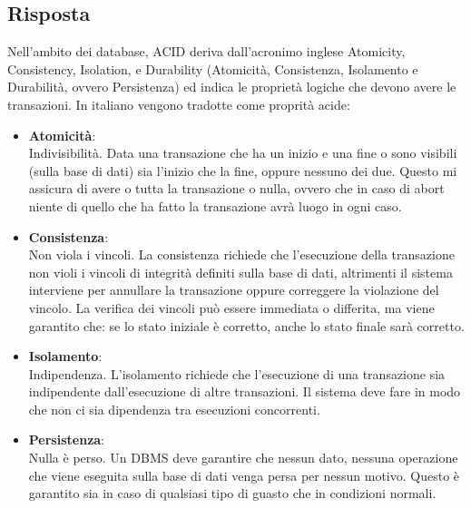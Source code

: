 \documentclass{article}
\begin{document}
\subsection*{Risposta}
Nell'ambito dei database, ACID deriva dall'acronimo inglese Atomicity, Consistency, Isolation, e Durability (Atomicità, Consistenza, Isolamento e Durabilità, ovvero Persistenza) ed indica le proprietà logiche che devono avere le transazioni. In italiano vengono tradotte come proprità acide:
\begin{itemize}
    \item \textbf{Atomicità}:\\ Indivisibilità. Data una transazione che ha un inizio e una fine o sono visibili (sulla base di dati) sia l'inizio che la fine, oppure nessuno dei due. Questo mi assicura di avere o tutta la transazione o nulla, ovvero che in caso di abort niente di quello che ha fatto la transazione avrà luogo in ogni caso.
    \item \textbf{Consistenza}:\\Non viola i vincoli. La consistenza richiede che l'esecuzione della transazione non violi i vincoli di integrità definiti sulla base di dati, altrimenti il sistema interviene per annullare la transazione oppure correggere la violazione del vincolo. La verifica dei vincoli può essere immediata o differita, ma viene garantito che: se lo stato iniziale è corretto, anche lo stato finale sarà corretto.
    \item \textbf{Isolamento}:\\Indipendenza. L'isolamento richiede che l'esecuzione di una transazione sia indipendente dall'esecuzione di altre transazioni. Il sistema deve fare in modo che non ci sia dipendenza tra esecuzioni concorrenti.
    \item \textbf{Persistenza}:\\Nulla è perso. Un DBMS deve garantire che nessun dato, nessuna operazione che viene eseguita sulla base di dati venga persa per nessun motivo. Questo è garantito sia in caso di qualsiasi tipo di guasto che in condizioni normali.
\end{itemize}
\end{document}
